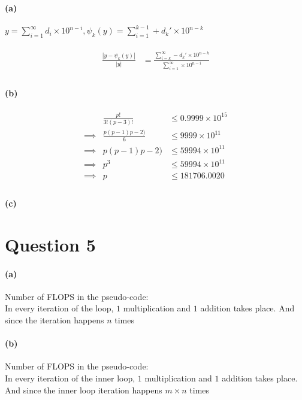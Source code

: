 \documentclass{article}
\begin{document}
\paragraph{(a)} $y = \sum_{i=1}^{\infty}d_i \times 10^{n-i},
\psi_k(y) = \sum_{i=1}^{k-1} + d_k' \times 10^{n-k}$\\\\
\begin{align*}
\frac{|y - \psi_k(y)|}{|y|} &= \frac{\sum_{i=k}^{\infty} - d_k' \times 10^{n-k}}{\sum_{i=1}^{\infty} \times 10^{n-i}}\\
\end{align*}


\paragraph{(b)}
\begin{align*}
&\frac{p!}{3!(p-3)!} &\leq 0.9999 \times 10^{15}\\
\implies &\frac{p(p-1)p-2)}{6} &\leq 9999 \times 10^{11}\\
\implies &p(p-1)p-2) &\leq 59994 \times 10^{11}\\
\implies &p^3 &\leq 59994 \times 10^{11}\\
\implies &p &\leq 181706.0020\\
\end{align*}
\paragraph{(c)}

\pagebreak
\section*{Question 5}
\label{sec:question-5}

\paragraph{(a)} Number of FLOPS in the pseudo-code:\\
In every iteration of the loop, $1$ multiplication and $1$ addition takes place. And since the iteration happens $n$ times\\

\paragraph{(b)} Number of FLOPS in the pseudo-code:\\
In every iteration of the inner loop, $1$ multiplication and $1$ addition takes place. And since the inner loop iteration happens $m \times n$ times\\
\end{document}
